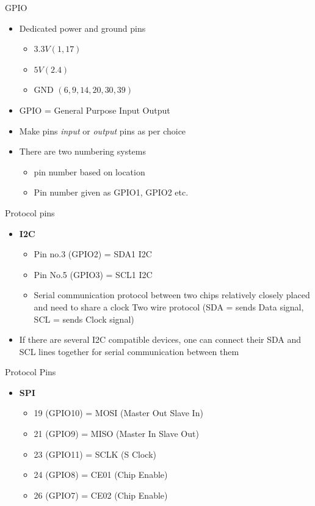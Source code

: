 \begin{frame}{GPIO}
	\begin{itemize}
		\item Dedicated power and ground pins
		\begin{itemize}
			\item $3.3V (1,17)$
			\item $5V (2.4)$
			\item GND $(6,9,14,20,30,39)$
		\end{itemize}
		\item GPIO = General Purpose Input Output
		\item Make pins \textit{input} or \textit{output} pins as per choice
		\item There are two numbering systems
		\begin{itemize}
			\item pin number based on location
			\item Pin number given as GPIO1, GPIO2 etc.
		\end{itemize}
	\end{itemize}
\end{frame}

\begin{frame}{Protocol pins}
	\begin{itemize}
		\item \textbf{I2C}
		\begin{itemize}
			\item Pin no.3 (GPIO2) = SDA1 I2C
			\item Pin No.5 (GPIO3) = SCL1 I2C
			\item Serial communication protocol between two chips relatively closely placed and need to share a clock
			Two wire protocol (SDA = sends Data signal, SCL = sends Clock signal)
		\end{itemize}
		\item If there are several I2C compatible devices, one can connect their SDA and SCL lines together for serial communication between them
	\end{itemize}
\end{frame}

\begin{frame}{Protocol Pins}
	\begin{itemize}
		\item \textbf{SPI}
		\begin{itemize}
			\item 19 (GPIO10) = MOSI (Master Out Slave In)
			\item 21 (GPIO9) = MISO (Master In Slave Out)
			\item 23 (GPIO11) = SCLK (S Clock)
			\item 24 (GPIO8) = CE01 (Chip Enable)
			\item 26 (GPIO7) = CE02 (Chip Enable)
		\end{itemize}
	\end{itemize}
\end{frame}